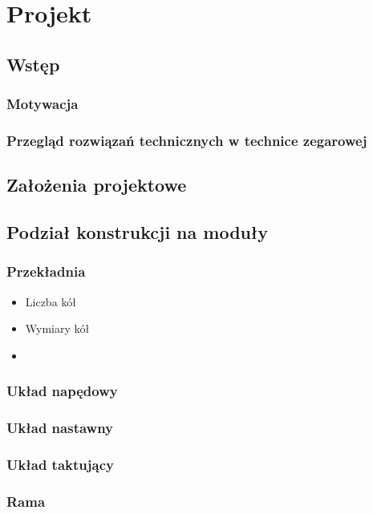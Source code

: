 \chapter{Projekt}
    \section{Wstęp}
        \subsection{Motywacja}
        \subsection{Przegląd rozwiązań technicznych w technice zegarowej}

    \section{Założenia projektowe}

    \section{Podział konstrukcji na moduły}
        \subsection{Przekładnia}
            \begin{itemize}
                \item Liczba kół
                \item Wymiary kół
                \item 
            \end{itemize}
        \subsection{Układ napędowy}
        	
        \subsection{Układ nastawny}
        \subsection{Układ taktujący}
        \subsection{Rama}
